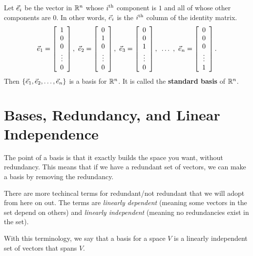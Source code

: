 \documentclass{ximera}
\begin{document}
\begin{example}
  Let $\vect{e}_i$ be the vector in $\R^n$ whose $i\th$ component is $1$
  and all of whose other components are $0$. In other words, $\vect{e}_i$
  is the $i\th$ column of the identity matrix.
  \begin{equation*}
    \vect{e}_1 = \startmat{c} 1 \\ 0 \\ 0 \\ \vdots \\ 0 \stopmat,\quad
    \vect{e}_2 = \startmat{c} 0 \\ 1 \\ 0 \\ \vdots \\ 0 \stopmat,\quad
    \vect{e}_3 = \startmat{c} 0 \\ 0 \\ 1 \\ \vdots \\ 0 \stopmat,\quad
    \ldots~,\quad
    \vect{e}_n = \startmat{c} 0 \\ 0 \\ 0 \\ \vdots \\ 1\stopmat.
  \end{equation*}
  Then $\set{\vect{e}_1,\vect{e}_2,\ldots,\vect{e}_n}$ is a basis for
  $\R^n$. It is called the \textbf{standard basis}%
  of\/ $\R^n$.
\end{example}



\section*{Bases, Redundancy, and Linear Independence}

The point of a basis is that it exactly builds the space you want, without redundancy. This means that if we have a redundant set of vectors, we can make a basis by removing the redundancy. 

There are more techincal terms for redundant/not redundant that we will adopt from here on out. The terms are \emph{linearly dependent} (meaning some vectors in the set depend on others) and \emph{linearly independent} (meaning no redundancies exist in the set).

With this terminology, we say that a basis for a space $V$ is a linearly independent set of vectors that spans $V$.
\end{document}
